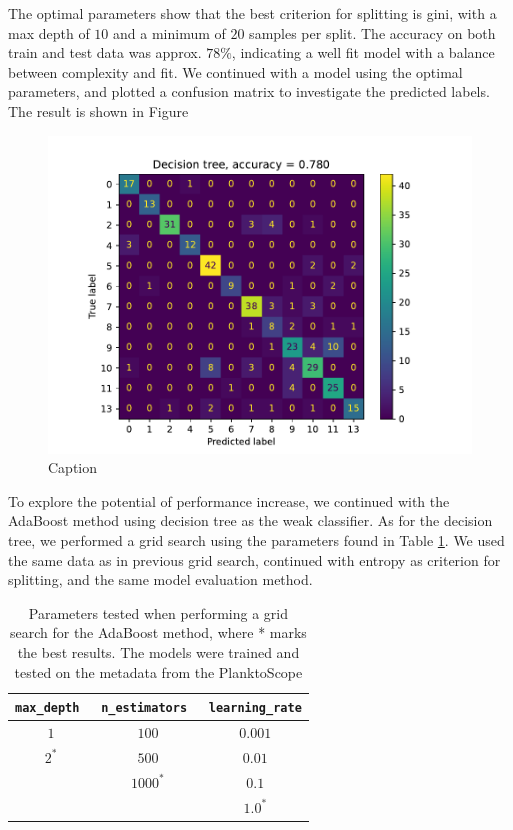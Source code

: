 The optimal parameters show that the best criterion for splitting is gini, with a max depth of $10$ and a minimum of $20$ samples per split. The accuracy on both train and test data was approx. $78\%$, indicating a well fit model with a balance between complexity and fit. 
We continued with a model using the optimal parameters, and plotted a confusion matrix to investigate the predicted labels. The result is shown in Figure
\begin{figure}
    \centering
    \includegraphics[width=\linewidth]{latex/figures/cm_tree_planktoscope_metadata.pdf}
    \caption{Caption}
    \label{fig:cm_tree_metadata}
\end{figure}

To explore the potential of performance increase, we continued with the AdaBoost method using decision tree as the weak classifier. As for the decision tree, we performed a grid search using the parameters found in Table \ref{tab:params_adaboost}. We used the same data as in previous grid search, continued with entropy as criterion for splitting, and the same model evaluation method.
\begin{table}[h]
    \centering
    \begin{tabular}{ccc}
        \hline
        \verb|max_depth| \, & \verb|n_estimators| \, & \verb|learning_rate| \\
        \hline 
        $1$ & $100$ & $0.001$ \\
        $2^*$ & $500$ & $0.01$ \\
         & $1000^*$ & $0.1$ \\
         & & $1.0^*$ \\
        \hline
    \end{tabular}
    \caption{Parameters tested when performing a grid search for the AdaBoost method, where * marks the best results. The models were trained and tested on the metadata from the PlanktoScope}
    \label{tab:params_adaboost}
\end{table}

